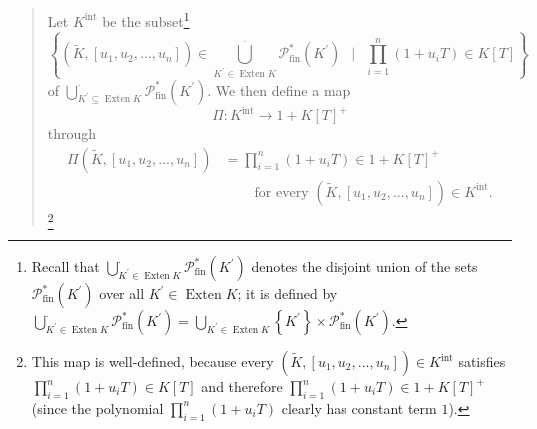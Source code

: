 \documentclass[numbers=enddot,12pt,final,onecolumn,notitlepage]{scrartcl}%
\begin{document}
\begin{quote}
Let $K^{\operatorname*{int}}$ be the subset\footnote{Recall that
$\bigcup\limits_{K^{\prime}\in\operatorname*{Exten}K}^{\cdot}\mathcal{P}%
_{\operatorname*{fin}}^{\ast}\left(  K^{\prime}\right)  $ denotes the disjoint
union of the sets $\mathcal{P}_{\operatorname*{fin}}^{\ast}\left(  K^{\prime
}\right)  $ over all $K^{\prime}\in\operatorname*{Exten}K$; it is defined by
$\bigcup\limits_{K^{\prime}\in\operatorname*{Exten}K}^{\cdot}\mathcal{P}%
_{\operatorname*{fin}}^{\ast}\left(  K^{\prime}\right)  =\bigcup
\limits_{K^{\prime}\in\operatorname*{Exten}K}\left\{  K^{\prime}\right\}
\times\mathcal{P}_{\operatorname*{fin}}^{\ast}\left(  K^{\prime}\right)  $.}%
\[
\left\{  \left(  \widetilde{K},\left[  u_{1},u_{2},...,u_{n}\right]  \right)
\in\bigcup\limits_{K^{\prime}\in\operatorname*{Exten}K}^{\cdot}\mathcal{P}%
_{\operatorname*{fin}}^{\ast}\left(  K^{\prime}\right)  \ \ \mid
\ \ \prod\limits_{i=1}^{n}\left(  1+u_{i}T\right)  \in K\left[  T\right]
\right\}
\]
of $\bigcup\limits_{K^{\prime}\subseteq\operatorname*{Exten}K}^{\cdot
}\mathcal{P}_{\operatorname*{fin}}^{\ast}\left(  K^{\prime}\right)  $. We then
define a map%
\[
\Pi:K^{\operatorname*{int}}\rightarrow1+K\left[  T\right]  ^{+}%
\]
through%
\begin{align*}
\Pi\left(  \widetilde{K},\left[  u_{1},u_{2},...,u_{n}\right]  \right)   &
=\prod\limits_{i=1}^{n}\left(  1+u_{i}T\right)  \in1+K\left[  T\right]  ^{+}\\
&  \ \ \ \ \ \ \ \ \ \ \text{for every }\left(  \widetilde{K},\left[
u_{1},u_{2},...,u_{n}\right]  \right)  \in K^{\operatorname*{int}}.
\end{align*}
\footnote{This map is well-defined, because every $\left(  \widetilde{K}%
,\left[  u_{1},u_{2},...,u_{n}\right]  \right)  \in K^{\operatorname*{int}}$
satisfies $\prod\limits_{i=1}^{n}\left(  1+u_{i}T\right)  \in K\left[
T\right]  $ and therefore $\prod\limits_{i=1}^{n}\left(  1+u_{i}T\right)
\in1+K\left[  T\right]  ^{+}$ (since the polynomial $\prod\limits_{i=1}%
^{n}\left(  1+u_{i}T\right)  $ clearly has constant term $1$).}


\end{quote}
\end{document}
